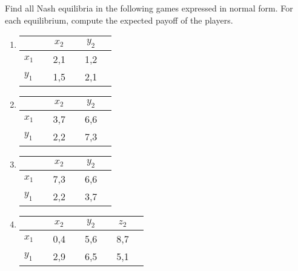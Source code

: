 \documentclass{../ape}
\begin{document}

\section{}
Find all Nash equilibria in the following games expressed in normal form. For each equilibrium, compute the expected payoff of the players. 

\begin{enumerate}
  \item
    \label{item:first}
	\begin{center}
		\begin{tabular}[h!]{l|ccccc}
			&& \Large{$x_2$} && \Large{$y_2$} & \\
			\hline
			\Large{$x_1$} && \Large{2,1} && \Large{1,2} & \\
			\Large{$y_1$} && \Large{1,5} && \Large{2,1} & 
		\end{tabular} 
	\end{center}
  \item
	\vspace{-.5cm}
	\begin{center}
		\begin{tabular}[h!]{l|ccccc}
			&& \Large{$x_2$} && \Large{$y_2$} & \\
			\hline
			\Large{$x_1$} && \Large{3,7} && \Large{6,6} & \\
			\Large{$y_1$} && \Large{2,2} && \Large{7,3} & 
		\end{tabular} 
	\end{center}
  \item
	\begin{center}
		\begin{tabular}[h!]{l|ccccc}
			&& \Large{$x_2$} && \Large{$y_2$} & \\
			\hline
			\Large{$x_1$} && \Large{7,3} && \Large{6,6} & \\
			\Large{$y_1$} && \Large{2,2} && \Large{3,7} & 
		\end{tabular} 
	\end{center}
  \item
	\begin{center}
		\begin{tabular}[h!]{l|ccccccc}
			&& \Large{$x_2$} && \Large{$y_2$} && \Large{$z_2$} & \\
			\hline
			\Large{$x_1$} && \Large{0,4} && \Large{5,6} && \Large{8,7} & \\
			\Large{$y_1$} && \Large{2,9} && \Large{6,5} && \Large{5,1} & 
		\end{tabular} 

\end{center}
\end{enumerate}
\end{document}
